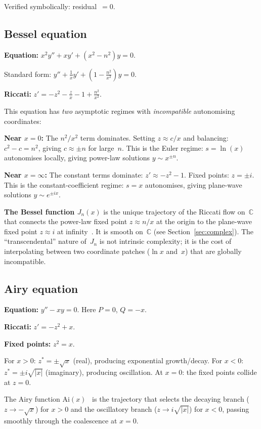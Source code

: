 \documentclass{amsart}
\theoremstyle{definition}
\theoremstyle{remark}
\begin{document}
Verified symbolically: residual~$= 0$. \checkmark

\subsection{Bessel equation}

\textbf{Equation:} $x^2 y'' + xy' + (x^2 - n^2)y = 0$.

Standard form: $y'' + \frac{1}{x}y' + \left(1 - \frac{n^2}{x^2}\right)y = 0$.

\textbf{Riccati:} $z' = -z^2 - \frac{z}{x} - 1 + \frac{n^2}{x^2}$.

This equation has \emph{two} asymptotic regimes with \emph{incompatible} autonomising coordinates:

\textbf{Near $x = 0$:} The $n^2/x^2$ term dominates. Setting $z \approx c/x$ and balancing: $c^2 - c = n^2$, giving $c \approx \pm n$ for large~$n$. This is the Euler regime: $s = \ln(x)$ autonomises locally, giving power-law solutions $y \sim x^{\pm n}$.

\textbf{Near $x = \infty$:} The constant terms dominate: $z' \approx -z^2 - 1$. Fixed points: $z = \pm i$. This is the constant-coefficient regime: $s = x$ autonomises, giving plane-wave solutions $y \sim e^{\pm ix}$.

\textbf{The Bessel function $J_n(x)$} is the unique trajectory of the Riccati flow on~$\mathbb{C}$ that connects the power-law fixed point $z \approx n/x$ at the origin to the plane-wave fixed point $z \approx i$ at infinity~\cite{Watson1944, AbSt1972}. It is smooth on~$\mathbb{C}$ (see Section~\ref{sec:complex}). The ``transcendental'' nature of~$J_n$ is not intrinsic complexity; it is the cost of interpolating between two coordinate patches ($\ln x$ and~$x$) that are globally incompatible.

\subsection{Airy equation}

\textbf{Equation:} $y'' - xy = 0$. Here $P = 0$, $Q = -x$.

\textbf{Riccati:} $z' = -z^2 + x$.

\textbf{Fixed points:} $z^2 = x$.

For $x > 0$: $z^* = \pm\sqrt{x}$ (real), producing exponential growth/decay. For $x < 0$: $z^* = \pm i\sqrt{|x|}$ (imaginary), producing oscillation. At $x = 0$: the fixed points collide at $z = 0$.

The Airy function $\mathrm{Ai}(x)$~\cite{AbSt1972, Olver1974} is the trajectory that selects the decaying branch ($z \to -\sqrt{x}$) for $x > 0$ and the oscillatory branch ($z \to i\sqrt{|x|}$) for $x < 0$, passing smoothly through the coalescence at $x = 0$.
\end{document}
